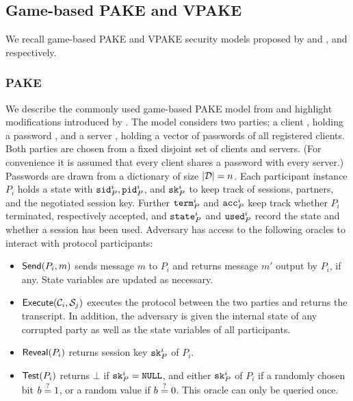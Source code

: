 \subsection{Game-based PAKE and VPAKE}
We recall game-based \ac{PAKE} and \ac{VPAKE} security models proposed by \citet{Bellare2000} and \citet{Abdalla2005}, and \citet{BenhamoudaP13} respectively.

\subsubsection{PAKE} \label{sec:pake-model}
We describe the commonly used game-based \ac{PAKE} model from \citet{Bellare2000} and highlight modifications introduced by \citet{Abdalla2005}.
The model considers two parties; a client \Client, holding a password \pwd, and a server \Server, holding a vector of passwords of all registered clients.
Both parties are chosen from a fixed disjoint set of clients and servers.
(For convenience it is assumed that every client shares a password with every server.)
Passwords \pwd are drawn from a dictionary \cD of size $|\mathcal{D}|=n$.
Each participant instance $P_i$ holds a state with $\mathtt{sid}_P^i, \mathtt{pid}_P^i$, and $\mathtt{sk}_P^i$ to keep track of sessions, partners, and the negotiated session key.
Further $\mathtt{term}_P^i$ and $\mathtt{acc}_P^i$ keep track whether $P_i$ terminated, respectively accepted, and $\mathtt{state}_P^i$ and $\mathtt{used}_P^i$ record the state and whether a session has been used.
Adversary \cA has access to the following oracles to interact with protocol participants:

\begin{itemize}
  \item $\mathsf{Send}(P_i, m)$ sends message $m$ to $P_i$ and returns message $m'$ output by $P_i$, if any.
    State variables are updated as necessary.
    
  \item $\mathsf{Execute}(\mathcal{C}_i, \mathcal{S}_{j})$ executes the protocol between the two parties and returns the transcript.
    In addition, the adversary is given the internal state of any corrupted party as well as the state variables of all participants.
  
  \item $\mathsf{Reveal}(P_i)$ returns session key $\mathtt{sk}_{P}^i$ of $P_i$.
  
  \item $\mathsf{Test}(P_i)$ returns $\bot$ if $\mathtt{sk}_{P}^i=\mathtt{NULL}$, and either $\mathtt{sk}_{P}^i$ of $P_i$ if a randomly chosen bit $b\stackrel{?}{=} 1$, or a random value if $b\stackrel{?}{=} 0$.
    This oracle can only be queried once.
\end{itemize}


